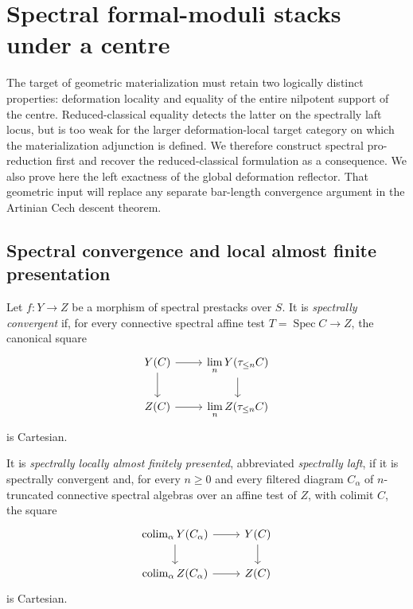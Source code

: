 \section{Spectral formal-moduli stacks under a centre}
\label{sec:bnli-defcent}

The target of geometric materialization must retain two logically distinct
properties: deformation locality and equality of the entire nilpotent support
of the centre.  Reduced-classical equality detects the latter on the
spectrally laft locus, but is too weak for the larger deformation-local target
category on which the materialization adjunction is defined.  We therefore
construct spectral pro-reduction first and recover the reduced-classical
formulation as a consequence.  We also prove here the left exactness of the
global deformation reflector.  That geometric input will replace any separate
bar-length convergence argument in the Artinian Cech descent theorem.

\subsection{Spectral convergence and local almost finite presentation}

\begin{definition}
\label{def:bnli-spectral-laft}
Let $f:Y\to Z$ be a morphism of spectral prestacks over $S$.  It is
\emph{spectrally convergent} if, for every connective spectral affine test
$T=\operatorname{Spec}C\to Z$, the canonical square
\[
\begin{tikzcd}
Y(C) \arrow[r] \arrow[d] & \displaystyle\lim_n Y(\tau_{\le n}C) \arrow[d]\\
Z(C) \arrow[r] & \displaystyle\lim_n Z(\tau_{\le n}C)
\end{tikzcd}
\]
is Cartesian.

It is \emph{spectrally locally almost finitely presented}, abbreviated
\emph{spectrally laft}, if it is spectrally convergent and, for every $n\ge0$
and every filtered diagram $C_\alpha$ of $n$-truncated connective spectral
algebras over an affine test of $Z$, with colimit $C$, the square
\[
\begin{tikzcd}
\operatorname*{colim}_\alpha Y(C_\alpha) \arrow[r] \arrow[d] &
Y(C) \arrow[d]\\
\operatorname*{colim}_\alpha Z(C_\alpha) \arrow[r] & Z(C)
\end{tikzcd}
\]
is Cartesian.
\end{definition}

